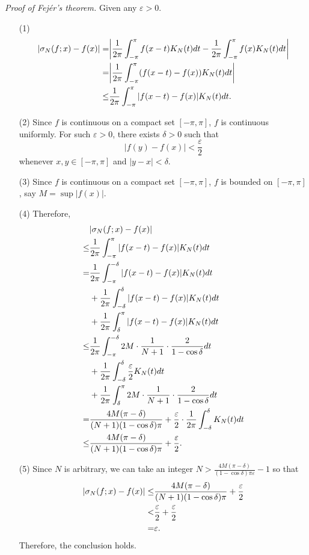\documentclass{article}
\begin{document}
\emph{Proof of Fej\'er's theorem.}
Given any $\varepsilon > 0$.
\begin{enumerate}
\item[(1)]
  \begin{align*}
    \abs{ \sigma_N(f;x) - f(x) }
    =& \abs{ \frac{1}{2\pi} \int_{-\pi}^{\pi} f(x-t) K_N(t) dt
      - \frac{1}{2\pi} \int_{-\pi}^{\pi} f(x) K_N(t) dt } \\
    =& \abs{ \frac{1}{2\pi} \int_{-\pi}^{\pi} (f(x-t)-f(x)) K_N(t) dt } \\
    \leq& \frac{1}{2\pi} \int_{-\pi}^{\pi} |f(x-t)-f(x)| K_N(t) dt.
  \end{align*}

\item[(2)]
Since $f$ is continuous on a compact set $[-\pi,\pi]$, $f$ is continuous uniformly.
For such $\varepsilon > 0$, there exists $\delta > 0$
such that
\[
  |f(y) - f(x)| < \frac{\varepsilon}{2}
\]
whenever $x,y \in [-\pi,\pi]$ and $|y-x| < \delta$.

\item[(3)]
Since $f$ is continuous on a compact set $[-\pi,\pi]$, $f$ is bounded
on $[-\pi,\pi]$, say $M = \sup|f(x)|$.

\item[(4)]
Therefore,
  \begin{align*}
    &\abs{ \sigma_N(f;x) - f(x) } \\
    \leq& \frac{1}{2\pi} \int_{-\pi}^{\pi} |f(x-t)-f(x)| K_N(t) dt \\
    =& \frac{1}{2\pi} \int_{-\pi}^{-\delta} |f(x-t)-f(x)| K_N(t) dt \\
      &+ \frac{1}{2\pi} \int_{-\delta}^{\delta} |f(x-t)-f(x)| K_N(t) dt \\
      &+ \frac{1}{2\pi} \int_{\delta}^{\pi} |f(x-t)-f(x)| K_N(t) dt \\
    \leq& \frac{1}{2\pi} \int_{-\pi}^{-\delta}
        2M \cdot \frac{1}{N+1} \cdot \frac{2}{1-\cos \delta} dt \\
      &+ \frac{1}{2\pi} \int_{-\delta}^{\delta} \frac{\varepsilon}{2} K_N(t) dt \\
      &+ \frac{1}{2\pi} \int_{\delta}^{\pi}
        2M \cdot \frac{1}{N+1} \cdot \frac{2}{1-\cos \delta} dt \\
    =& \frac{4M (\pi - \delta)}{(N+1)(1 - \cos \delta) \pi}
      + \frac{\varepsilon}{2} \cdot \frac{1}{2\pi} \int_{-\delta}^{\delta} K_N(t) dt \\
    \leq& \frac{4M (\pi - \delta)}{(N+1)(1 - \cos \delta) \pi} + \frac{\varepsilon}{2}.
  \end{align*}

\item[(5)]
Since $N$ is arbitrary,
we can take an integer
$N > \frac{4M(\pi-\delta)}{(1-\cos\delta)\pi\varepsilon} - 1$
so that
  \begin{align*}
    \abs{ \sigma_N(f;x) - f(x) }
    \leq& \frac{4M (\pi - \delta)}{(N+1)(1 - \cos \delta) \pi} + \frac{\varepsilon}{2} \\
    <& \frac{\varepsilon}{2} + \frac{\varepsilon}{2} \\
    =& \varepsilon.
  \end{align*}
Therefore, the conclusion holds.
\end{enumerate}
\end{document}
